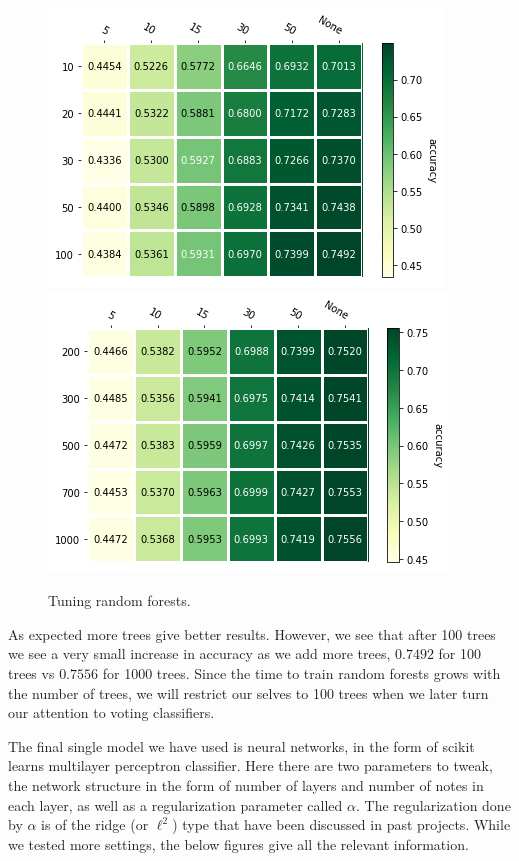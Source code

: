 \documentclass[parskip=half]{scrartcl}
\theoremstyle{definition}
\theoremstyle{remark}
\begin{document}
\begin{figure}[H]
\caption{Tuning random forests.}
\centering
\includegraphics[scale=0.6]{images/forrest_params1.png}
\includegraphics[scale=0.6]{images/forrest_params2.png}
\end{figure}

As expected more trees give better results. 
However, we see that after 100 trees we see a very small increase in accuracy as we add more trees, $0.7492$ for 100 trees vs $0.7556$ for 1000 trees. 
Since the time to train random forests grows with the number of trees, we will restrict our selves to 100 trees when we later turn our attention to voting classifiers. 

The final single model we have used is neural networks, in the form of scikit learns multilayer perceptron classifier. 
Here there are two parameters to tweak, the network structure in the form of number of layers and number of notes in each layer, as well as a regularization parameter called $\alpha$.
The regularization done by $\alpha$ is of the ridge (or $\ell^2$) type that have been discussed in past projects. 
While we tested more settings, the below figures give all the relevant information.
\end{document}
